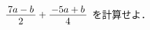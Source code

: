 \documentclass[../../../../hsm_tok_q.tex]{subfiles}
\begin{document}
    $\myfraca{7a-b}{2}+\myfraca{-5a+b}{4}$\; を計算せよ．
\end{document}
